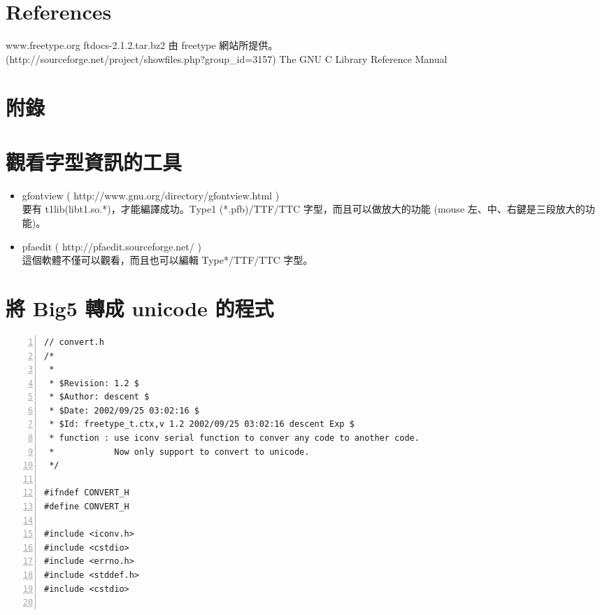 \documentclass[12pt,a4]{article}
\begin{document}
\begin{CJK}{UTF8}{bsmi}
\newpage
\section{References}
\begin{thebibliography}{99}
www.freetype.org
ftdocs-2.1.2.tar.bz2 由 freetype 網站所提供。\\
(http://sourceforge.net/project/showfiles.php?group\_{}id=3157)
The GNU C Library Reference Manual
\end{thebibliography}

\newpage
\section{附錄}
\appendix
\section{觀看字型資訊的工具}
\begin{itemize}
\item
gfontview ( http://www.gnu.org/directory/gfontview.html )\\
要有 t1lib(libt1.so.*)，才能編譯成功。Type1 (*.pfb)/TTF/TTC 字型，而且可以做放大的功能 (mouse 左、中、右鍵是三段放大的功能)。
\item
pfaedit ( http://pfaedit.sourceforge.net/ )\\ 
這個軟體不僅可以觀看，而且也可以編輯 Type*/TTF/TTC 字型。 
\newpage
\end{itemize}
\section{\label{big52unicode}將 Big5 轉成 unicode 的程式}
\begin{Verbatim}[commandchars=@\^?,numbers=left]
// convert.h
/*
 *
 * $Revision: 1.2 $
 * $Author: descent $
 * $Date: 2002/09/25 03:02:16 $
 * $Id: freetype_t.ctx,v 1.2 2002/09/25 03:02:16 descent Exp $
 * function : use iconv serial function to conver any code to another code.
 *            Now only support to convert to unicode. 
 */

#ifndef CONVERT_H
#define CONVERT_H

#include <iconv.h>
#include <cstdio>
#include <errno.h>
#include <stddef.h>
#include <cstdio>


\end{Verbatim}
\end{CJK}
\end{document}
